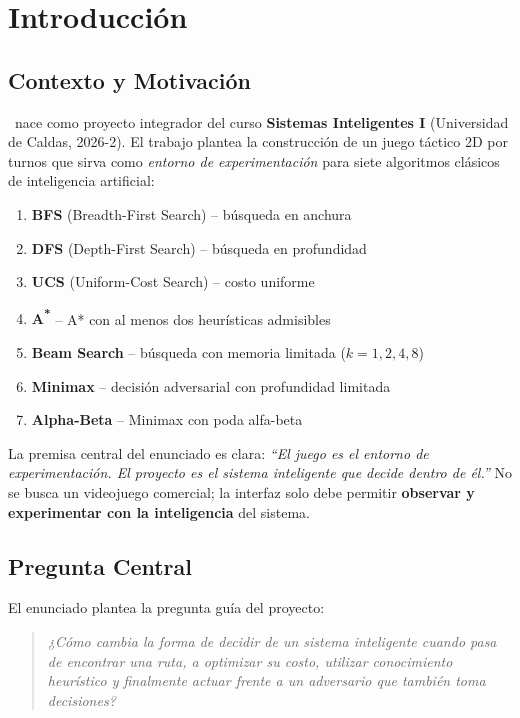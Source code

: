 \chapter{Introducción}
\label{ch:introduccion}

\section{Contexto y Motivación}
\label{sec:contexto}

\tacticalgrid\ nace como proyecto integrador del curso \textbf{Sistemas Inteligentes I} (Universidad
de Caldas, 2026-2). El trabajo plantea la
construcción de un juego táctico 2D por turnos que sirva como \textit{entorno de experimentación}
para siete algoritmos clásicos de inteligencia artificial:

\begin{enumerate}
\item \textbf{BFS} (Breadth-First Search) -- búsqueda en anchura
\item \textbf{DFS} (Depth-First Search) -- búsqueda en profundidad
\item \textbf{UCS} (Uniform-Cost Search) -- costo uniforme
\item \textbf{A\textsuperscript{*}} -- A* con al menos dos heurísticas admisibles
\item \textbf{Beam Search} -- búsqueda con memoria limitada ($k = 1,2,4,8$)
\item \textbf{Minimax} -- decisión adversarial con profundidad limitada
\item \textbf{Alpha-Beta} -- Minimax con poda alfa-beta
\end{enumerate}

La premisa central del enunciado es clara: \textit{``El juego es el entorno de experimentación.
El proyecto es el sistema inteligente que decide dentro de él.''} No se busca un videojuego
comercial; la interfaz solo debe permitir \textbf{observar y experimentar con la inteligencia}
del sistema.

\section{Pregunta Central}
\label{sec:pregunta-central}

El enunciado plantea la pregunta guía del proyecto:

\begin{quote}
\textit{¿Cómo cambia la forma de decidir de un sistema inteligente cuando pasa de encontrar una
ruta, a optimizar su costo, utilizar conocimiento heurístico y finalmente actuar frente a un
adversario que también toma decisiones?}
\end{quote}

